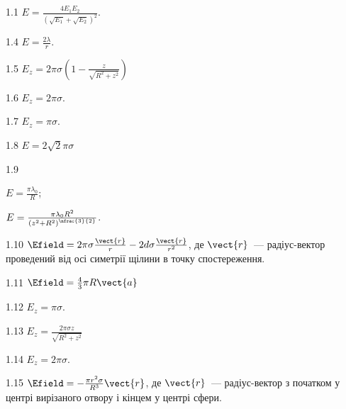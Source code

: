 \protect \section *{\protect {}}
\begin{Solution}{1.{1}}
	$E = \frac{4E_1E_2}{(\sqrt{E_1} + \sqrt{E_2})^2}$.
\end{Solution}
\begin{Solution}{1.{4}}
	$E = \frac{2\lambda}{r}.$
\end{Solution}
\begin{Solution}{1.{5}}
	$E_z = 2\pi\sigma \left( 1 - \frac{z}{\sqrt{R^2 + z^2}}\right)$
\end{Solution}
\begin{Solution}{1.{6}}
	$E_z = 2\pi\sigma$.
\end{Solution}
\begin{Solution}{1.{7}}
	$E_z = \pi\sigma$.
\end{Solution}
\begin{Solution}{1.{8}}
	$E=2\sqrt{2}\pi\sigma$
\end{Solution}
\begin{Solution}{1.{9}}
	\begin{enumerate*}[label=\alph*)]
		\item $E = \frac{\pi\lambda_0}{R}$;
		\item $E = \frac{\pi\lambda_0R^2}{\left( z^2 + R^2\right)^{\nfrac{3}{2}}}$.
	\end{enumerate*}
\end{Solution}
\begin{Solution}{1.{10}}
	$\Efield = 2\pi\sigma\frac{\vect{r}}{r} - 2d\sigma\frac{\vect{r}}{r^2}$, де $\vect{r}$~--- радіус-вектор проведений від осі симетрії щілини в точку спостереження.
\end{Solution}
\begin{Solution}{1.{11}}
	$\Efield = \frac43 \pi R \vect{a}$
\end{Solution}
\begin{Solution}{1.{12}}
	$E_z = \pi\sigma$.
\end{Solution}
\begin{Solution}{1.{13}}
	$E_z = \frac{2\pi\sigma z}{\sqrt{R^2 + z^2}}$
\end{Solution}
\begin{Solution}{1.{14}}
	$E_z = 2\pi\sigma$.
\end{Solution}
\begin{Solution}{1.{15}}
	$\Efield =-\frac{\pi r^2 \sigma}{R^3}\vect{r}$, де $\vect{r}$~--- радіус-вектор з початком у центрі вирізаного отвору і кінцем у центрі сфери.
\end{Solution}
